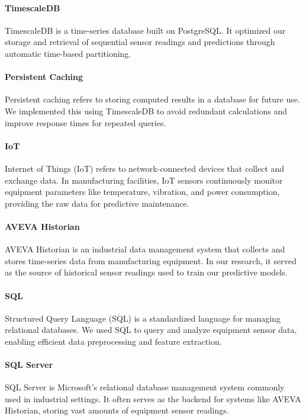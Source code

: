 \paragraph{TimescaleDB} TimescaleDB is a time-series database built on PostgreSQL. It optimized our storage and retrieval of sequential sensor readings and predictions through automatic time-based partitioning.

\paragraph{Persistent Caching} Persistent caching refers to storing computed results in a database for future use. We implemented this using TimescaleDB to avoid redundant calculations and improve response times for repeated queries.

\paragraph{IoT} Internet of Things (IoT) refers to network-connected devices that collect and exchange data. In manufacturing facilities, IoT sensors continuously monitor equipment parameters like temperature, vibration, and power consumption, providing the raw data for predictive maintenance.

\paragraph{AVEVA Historian} AVEVA Historian is an industrial data management system that collects and stores time-series data from manufacturing equipment. In our research, it served as the source of historical sensor readings used to train our predictive models.

\paragraph{SQL} Structured Query Language (SQL) is a standardized language for managing relational databases. We used SQL to query and analyze equipment sensor data, enabling efficient data preprocessing and feature extraction.

\paragraph{SQL Server} SQL Server is Microsoft's relational database management system commonly used in industrial settings. It often serves as the backend for systems like AVEVA Historian, storing vast amounts of equipment sensor readings.

